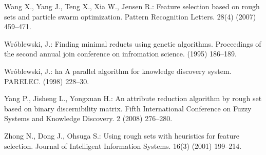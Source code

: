 \documentclass[11pt]{article}   %
\begin{document}
\begin{thebibliography}{}
	Wang X., Yang J., Teng X., Xia W., Jensen R.:
	Feature selection based on rough sets and particle swarm optimization.
	Pattern Recognition Letters. 28(4) (2007) 459--471.
	
	Wr\'oblewski, J.: 
	Finding minimal reducts using genetic algorithms.
	Proceedings of the second annual join conference on infromation science. (1995) 186--189.

	Wr\'oblewski, J.: ha
	A parallel algorithm for knowledge discovery system.
	PARELEC. (1998) 228--30.

	Yang P., Jisheng L., Yongxuan H.:
	An attribute reduction algorithm by rough set based on binary discernibility matrix.
	Fifth International Conference on Fuzzy Systems and Knowledge Discovery. 2 (2008) 276--280.
	
	Zhong N., Dong J., Ohsuga S.:
	Using rough sets with heuristics for feature selection.
	Journal of Intelligent Information Systems. 16(3) (2001) 199--214.


			
%
%

\end{thebibliography}
\end{document}

